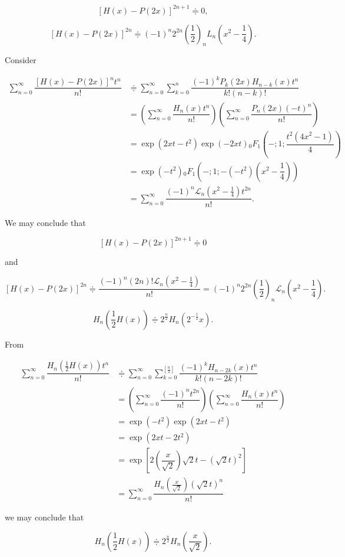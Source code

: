 \begin{problem}\label{problem6chapter15}
$$[H(x)-P(2x)]^{2n+1} \doteqdot 0,$$

$$[H(x)-P(2x)]^{2n} \doteqdot (-1)^n 2^{2n} \left( \dfrac{1}{2} \right)_n L_n \left( x^2 - \dfrac{1}{4} \right).$$
\end{problem}
\begin{solution}
Consider

$$\begin{array}{ll}
\displaystyle\sum_{n=0}^{\infty} \dfrac{[H(x)-P(2x)]^nt^n}{n!} &\doteqdot \displaystyle\sum_{n=0}^{\infty} \displaystyle\sum_{k=0}^n \dfrac{(-1)^k P_k(2x)H_{n-k}(x) t^n}{k! (n-k)!} \\
&= \left( \displaystyle\sum_{n=0}^{\infty} \dfrac{H_n(x)t^n}{n!} \right) \left( \displaystyle\sum_{n=0}^{\infty} \dfrac{P_n(2x)(-t)^n}{n!} \right) \\
&= \exp(2xt-t^2) \exp(-2xt) {}_0F_1 \left(-;1; \dfrac{t^2(4x^2-1)}{4} \right) \\
&= \exp(-t^2) {}_0F_1 \left(-;1;-(-t^2)(x^2-\dfrac{1}{4}) \right) \\
&= \displaystyle\sum_{n=0}^{\infty} \dfrac{(-1)^n \mathscr{L}_n(x^2 - \frac{1}{4}) t^{2n}}{n!}.
\end{array}$$

We may conclude that

$$[H(x) - P(2x)]^{2n+1} \doteqdot 0$$

and

$$[H(x) - P(2x)]^{2n} \doteqdot \dfrac{(-1)^n (2n)! \mathscr{L}_n(x^2-\frac{1}{4})}{n!} = (-1)^n 2^{2n} \left( \dfrac{1}{2} \right)_n \mathscr{L}_n\left(x^2 - \dfrac{1}{4} \right).$$
\end{solution}
\begin{problem}\label{problem7chapter15}
$$H_n \left( \dfrac{1}{2} H(x) \right) \doteqdot 2^{\frac{n}{2}} H_n(2^{-\frac{1}{2}}x).$$
\end{problem}
\begin{solution}
From

$$\begin{array}{ll}
\displaystyle\sum_{n=0}^{\infty} \dfrac{H_n(\frac{1}{2}H(x))t^n}{n!} &\doteqdot \displaystyle\sum_{n=0}^{\infty} \displaystyle\sum_{k=0}^{[\frac{n}{2}]} \dfrac{(-1)^k H_{n-2k}(x) t^n}{k! (n-2k)!} \\
&= \left( \displaystyle\sum_{n=0}^{\infty} \dfrac{(-1)^n t^{2n}}{n!} \right) \left( \displaystyle\sum_{n=0}^{\infty} \dfrac{H_n(x) t^n}{n!} \right) \\
&= \exp(-t^2) \exp(2xt-t^2) \\
&= \exp(2xt-2t^2) \\
&= \exp \left[ 2 \left( \dfrac{x}{\sqrt{2}} \right) \sqrt{2} t - (\sqrt{2}t)^2 \right] \\
&= \displaystyle\sum_{n=0}^{\infty} \dfrac{H_n(\frac{x}{\sqrt{2}}) (\sqrt{2}t)^n}{n!}
\end{array}$$

we may conclude that

$$H_n \left( \dfrac{1}{2} H(x) \right) \doteqdot 2^{\frac{n}{2}}H_n \left( \dfrac{x}{\sqrt{2}} \right).$$
\end{solution}
